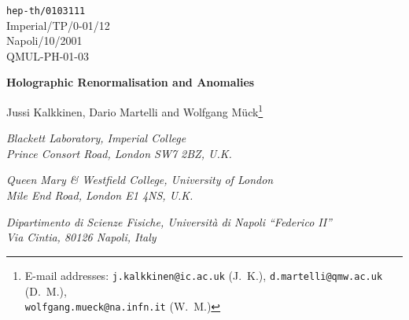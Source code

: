 \documentclass[a4paper,12pt]{article}
\begin{document}
\providecommand{\e}[1]{\mathrm{e}^{#1}}

\begin{titlepage}

\begin{flushleft}
       \hfill                      {\tt hep-th/0103111}\\ 
       \hfill                       Imperial/TP/0-01/12 \\
       \hfill                       Napoli/10/2001 \\
       \hfill                       QMUL-PH-01-03 \\ 
\end{flushleft}
\vspace*{8mm}

\begin{center}
\textbf{\LARGE Holographic Renormalisation and Anomalies}\\
\vspace*{14mm}

{\large Jussi Kalkkinen\coordHE{}, 
Dario Martelli\coordHE{} 
and Wolfgang M\"uck\coordHE{}\footnote{E-mail addresses: 
\texttt{j.kalkkinen@ic.ac.uk} (J.~K.), 
\texttt{d.martelli@qmw.ac.uk} (D.~M.), \\
\texttt{wolfgang.mueck@na.infn.it} (W.~M.)}} \\
\vspace*{6mm}

\emph{\coordHE{} Blackett Laboratory, Imperial College} \\
\emph{       Prince Consort Road, London SW7 2BZ, U.K.}
\vspace*{2mm}

\emph{\coordHE{} Queen Mary \& Westfield College, University of London} \\
\emph{       Mile End Road, London E1 4NS, U.K.}
\vspace*{2mm}

\emph{\coordHE{} Dipartimento di Scienze Fisiche, Universit\`a di
             Napoli ``Federico II''} \\
\emph{       Via Cintia, 80126 Napoli, Italy}

\vspace*{10mm}
\end{center}




\end{titlepage}
\end{document}
